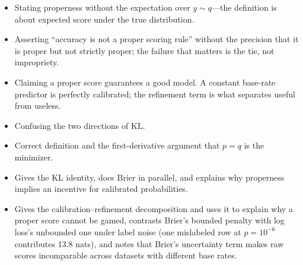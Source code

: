 \begin{interviewq}
\redflags
\begin{itemize}
    \item Stating properness without the expectation over $y \sim q$---the definition is about expected score under the true distribution.
    \item Asserting ``accuracy is not a proper scoring rule'' without the precision that it is proper but not strictly proper; the failure that matters is the tie, not impropriety.
    \item Claiming a proper score guarantees a good model. A constant base-rate predictor is perfectly calibrated; the refinement term is what separates useful from useless.
    \item Confusing the two directions of KL.
\end{itemize}


\goodgreat
\begin{itemize}
    \item {} Correct definition and the first-derivative argument that $p=q$ is the minimizer.
    \item {} Gives the KL identity, does Brier in parallel, and explains why properness implies an incentive for calibrated probabilities.
    \item {} Gives the calibration--refinement decomposition and uses it to explain why a proper score cannot be gamed, contrasts Brier's bounded penalty with log loss's unbounded one under label noise (one mislabeled row at $p=10^{-6}$ contributes 13.8 nats), and notes that Brier's uncertainty term makes raw scores incomparable across datasets with different base rates.
\end{itemize}

\end{interviewq}

